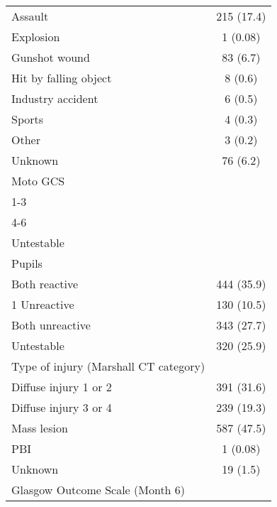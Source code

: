 \documentclass{article}
\begin{document}
\begin{table}[H]
\begin{center}
\begin{tabular}{lc}
\hspace{1 em} Assault & 215 (17.4)\\
\hspace{1 em} Explosion & 1 (0.08)\\
\hspace{1 em} Gunshot wound & 83 (6.7)\\
\hspace{1 em} Hit by falling object & 8 (0.6)\\
\hspace{1 em} Industry accident & 6 (0.5)\\
\hspace{1 em} Sports & 4 (0.3)\\
\hspace{1 em} Other & 3 (0.2)\\
\hspace{1 em} Unknown & 76 (6.2)\\
Moto GCS & \\
\hspace{1 em} 1-3 &\\
\hspace{1 em} 4-6 & \\
\hspace{1 em} Untestable\\
Pupils & \\
\hspace{1 em} Both reactive & 444 (35.9)\\
\hspace{1 em} 1 Unreactive & 130 (10.5)\\
\hspace{1 em} Both unreactive & 343 (27.7)\\
\hspace{1 em} Untestable & 320 (25.9)\\
Type of injury (Marshall CT category) & \\
\hspace{1 em} Diffuse injury 1 or 2 & 391 (31.6)\\
\hspace{1 em} Diffuse injury 3 or 4 & 239 (19.3)\\
\hspace{1 em} Mass lesion & 587 (47.5)\\
\hspace{1 em} PBI & 1 (0.08)\\
\hspace{1 em} Unknown & 19 (1.5) \\
Glasgow Outcome Scale (Month 6)& \\

\end{tabular}
\end{center}
\end{table}
\end{document}
